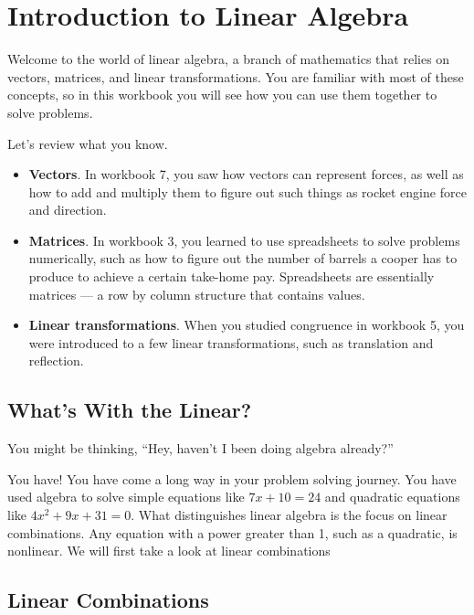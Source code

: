 \chapter{Introduction to Linear Algebra}

Welcome to the world of linear algebra, a branch of mathematics that relies on 
vectors, matrices, and linear transformations. You are familiar with most of 
these concepts, so in this workbook you will see how you can use them together 
to solve problems.  

Let's review what you know.

\begin{itemize}
\item \textbf{Vectors}. In workbook 7, you saw how vectors can represent 
forces, as well as how to add and multiply them to figure out such things as 
rocket engine force and direction. 
\item \textbf{Matrices}. In workbook 3, you learned to use spreadsheets to 
solve problems numerically, such as how to figure out the number of barrels a 
cooper has to produce to achieve a certain take-home pay. Spreadsheets are 
essentially matrices --- a row by column structure that contains values. 
\item \textbf{Linear transformations}. When you studied congruence in workbook 
5, you were introduced to a few linear transformations, such as translation 
and reflection. 
\end{itemize}

\section{What's With the Linear?}

You might be thinking, “Hey, haven't I been doing algebra already?” 

You have! You have come a long way in your problem solving journey. You have 
used algebra to solve simple equations like $7x + 10 = 24$ and quadratic 
equations like $4x^{2} + 9x + 31 = 0$. What distinguishes linear algebra is 
the focus on linear combinations. Any equation with a power greater than 1, 
such as a quadratic, is nonlinear.
We will first take a look at linear combinations

\section{Linear Combinations}

